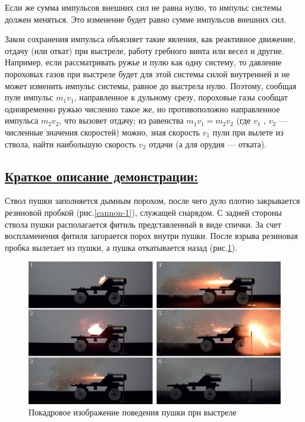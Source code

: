 \documentclass[14pt,a4paper,oneside]{extarticle}	%
\begin{document}
Если же сумма импульсов внешних сил не равна нулю, то импульс системы должен меняться. 
Это изменение будет равно сумме импульсов внешних сил.

Закон сохранения импульса объясняет такие явления, как реактивное движение, отдачу (или откат) при выстреле, работу гребного винта или весел и другие.
Например, если рассматривать ружье и пулю как одну систему, то давление пороховых газов при выстреле будет для этой системы силой внутренней и не может изменить импульс системы, равное до выстрела нулю. Поэтому, сообщая пуле импульс $ m_{1}v_{1} $, направленное к дульному срезу, пороховые газы сообщат одновременно ружью численно такое же, но противоположно направленное импульса $ m_{2}v_{2} $, что вызовет отдачу; из равенства  $ m_{1}v_{1} = m_{2}v_{2} $ (где $ v_{1} $ , $ v_{2} $ — численные значения скоростей) можно, зная скорость $ v_{1} $ пули при вылете из ствола, найти наибольшую скорость $ v_{2} $ отдачи (а для орудия — отката).

\subsection*{\underline{Краткое описание демонстрации:}}

Ствол пушки заполняется дымным порохом, после чего дуло плотно закрывается резиновой пробкой (рис.\ref{cannon-1}), служащей снарядом.
С задней стороны ствола пушки располагается фитиль представленный в виде спички.
За счет воспламенения фитиля загорается порох внутри пушки.
После взрыва резиновая пробка вылетает из пушки, а пушка откатывается назад (рис.\ref{cannon-2}).

\begin{figure}
	\centering 	
	\includegraphics[width=0.9\linewidth]{cannon-2.png}
	\caption{Покадровое изображение поведения пушки при выстреле}
	\label{cannon-2}
\end{figure}
\end{document}
